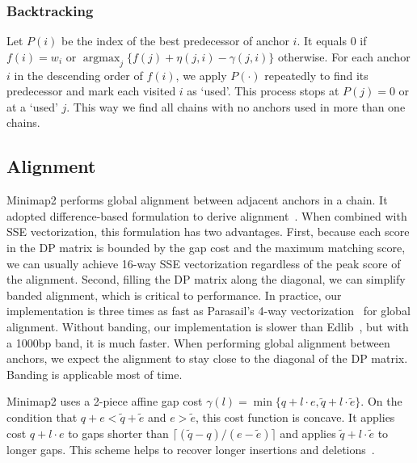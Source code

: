 \documentclass{bioinfo}
\DeclareMathOperator*{\argmax}{argmax}
\begin{document}
\begin{methods}

\subsubsection{Backtracking}
Let $P(i)$ be the index of the best predecessor of anchor $i$. It equals 0 if
$f(i)=w_i$ or $\argmax_j\{f(j)+\eta(j,i)-\gamma(j,i)\}$ otherwise. For each
anchor $i$ in the descending order of $f(i)$, we apply $P(\cdot)$ repeatedly to
find its predecessor and mark each visited $i$ as `used'. This process stops at
$P(j)=0$ or at a `used' $j$. This way we find all chains with no anchors used
in more than one chains.

\subsection{Alignment}

Minimap2 performs global alignment between adjacent anchors in a chain. It
adopted difference-based formulation to derive
alignment~\citep{Wu:1996aa,Suzuki:2016}. When combined with SSE vectorization,
this formulation has two advantages. First, because each score in the DP matrix
is bounded by the gap cost and the maximum matching score, we can usually
achieve 16-way SSE vectorization regardless of the peak score of the
alignment. Second, filling the DP matrix along the diagonal, we can simplify
banded alignment, which is critical to performance. In practice, our
implementation is three times as fast as Parasail's 4-way
vectorization~\citep{Daily:2016aa} for global alignment.
Without banding, our implementation is slower than Edlib~\citep{Sosic:2017aa},
but with a 1000bp band, it is much faster. When performing global alignment
between anchors, we expect the alignment to stay close to the diagonal of the
DP matrix. Banding is applicable most of time.

Minimap2 uses a 2-piece affine gap cost
$\gamma(l)=\min\{q+l\cdot e,\tilde{q}+l\cdot\tilde{e}\}$.
On the condition that $q+e<\tilde{q}+\tilde{e}$ and $e>\tilde{e}$, this
cost function is concave. It applies cost $q+l\cdot e$ to gaps shorter than
$\lceil(\tilde{q}-q)/(e-\tilde{e})\rceil$ and applies
$\tilde{q}+l\cdot\tilde{e}$ to longer gaps. This scheme helps to recover
longer insertions and deletions~\citep{Gotoh:1990aa}.


\end{methods}
\end{document}
